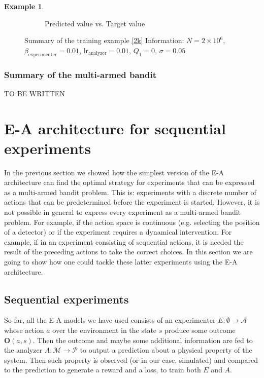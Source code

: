 \documentclass[11pt,a4paper,twoside]{report}
\newcommand{\+}{\textnormal{+} }
\theoremstyle{definition}
\newtheorem{myex}[mythm]{Example}
\numberwithin{equation}{chapter}
\begin{document}
\begin{myex}
\begin{figure}[]
\begin{subfigure}{.5\textwidth}
        \caption{Predicted value vs. Target value}
        \label{fig:actionsMAB6}
      \end{subfigure}
      \caption{ Summary of the training example \eqref{2k}
         Information: $N=2\times10^6$,
      $\beta_\text{experimenter}=0.01$, $\text{lr}_\text{analyzer}=0.01$,
      $Q_1=0$, $\sigma=0.05$}
    \end{figure}
  \end{myex}

  \subsection{Summary of the multi-armed bandit}
  TO BE WRITTEN



\chapter{E-A architecture for sequential experiments}

In the previous section we showed how the simplest version of the
E-A architecture can find the optimal strategy for experiments that can be
expressed as a multi-armed bandit problem. This is: experiments with a discrete
number of actions that can be predetermined before the experiment is started.
However, it is not possible in general to express every experiment as a 
multi-armed bandit problem. For example, if the action space is continuous 
(e.g. selecting the position of a detector) or if the experiment 
requires a dynamical intervention. For example, if in an experiment
consisting of sequential actions, it is needed the result of 
the preceding actions to take the correct choices. In this section we are going
to show how one could tackle these latter experiments using the E-A 
architecture. 

\section{Sequential experiments}

So far, all the E-A models we have used consists of an experimenter $E:\emptyset
\rightarrow \mathcal{A}$ whose action $a$ over the environment in the state $s$
produce some outcome $\textbf{O}(a,s)$. Then the outcome and maybe some
additional information are fed to the analyzer $A:\mathcal{M} \rightarrow
\mathcal{P}$ to output a prediction about a physical property of the system.
Then such property is observed (or in our case, simulated) and compared to the
prediction to generate a reward and a loss, to train both $E$ and $A$. 
\end{document}
